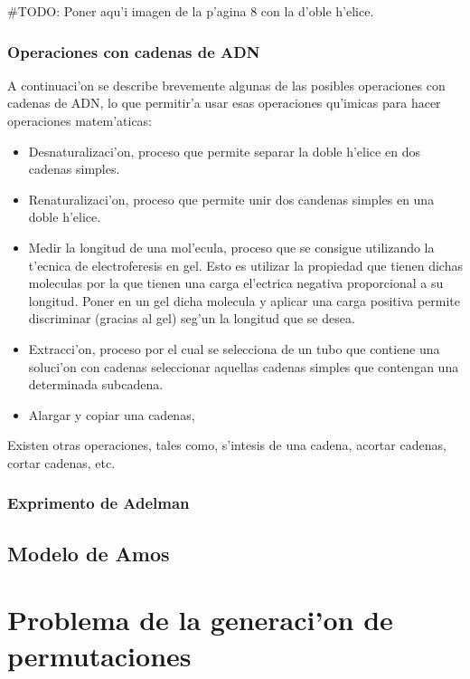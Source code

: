 \documentclass[12pt]{article}
\begin{document}
#TODO: Poner aqu'i imagen de la p'agina 8 con la d'oble h'elice.

\subsubsection{Operaciones con cadenas de ADN}

A continuaci'on se describe brevemente algunas de las posibles operaciones con cadenas de ADN, lo que permitir'a
usar esas operaciones qu'imicas para hacer operaciones matem'aticas:

\begin{itemize}
    \item Desnaturalizaci'on, proceso que permite separar la doble h'elice en dos cadenas simples.
    \item Renaturalizaci'on, proceso que permite unir dos candenas simples en una doble h'elice.
    \item Medir la longitud de una mol'ecula, proceso que se consigue utilizando la t'ecnica de electroferesis
    en gel. Esto es utilizar la propiedad que tienen dichas moleculas por la que tienen una carga el'ectrica
    negativa proporcional a su longitud. Poner en un gel dicha molecula y aplicar una carga positiva
    permite discriminar (gracias al gel) seg'un la longitud que se desea.
    \item Extracci'on, proceso por el cual se selecciona de un tubo que contiene una soluci'on con cadenas
    seleccionar aquellas cadenas simples que contengan una determinada subcadena.
    \item Alargar y copiar una cadenas,
\end{itemize}

Existen otras operaciones, tales como, s'intesis de una cadena, acortar cadenas, cortar cadenas, etc.

\subsubsection{Exprimento de Adelman}

\subsection{Modelo de Amos}

\section{Problema de la generaci'on de permutaciones}
\end{document}

